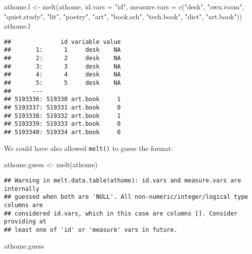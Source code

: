 \documentclass[
]{book}
\newenvironment{Shaded}{\begin{snugshade}}{\end{snugshade}}
\newcommand{\AttributeTok}[1]{\textcolor[rgb]{0.77,0.63,0.00}{#1}}
\newcommand{\FunctionTok}[1]{\textcolor[rgb]{0.00,0.00,0.00}{#1}}
\newcommand{\NormalTok}[1]{#1}
\newcommand{\OtherTok}[1]{\textcolor[rgb]{0.56,0.35,0.01}{#1}}
\newcommand{\StringTok}[1]{\textcolor[rgb]{0.31,0.60,0.02}{#1}}
\begin{document}
\begin{Shaded}
\begin{Highlighting}[]
\NormalTok{athome.l }\OtherTok{\textless{}{-}} \FunctionTok{melt}\NormalTok{(athome, }
                 \AttributeTok{id.vars =} \StringTok{"id"}\NormalTok{,}
                 \AttributeTok{measure.vars =} \FunctionTok{c}\NormalTok{(}\StringTok{"desk"}\NormalTok{, }\StringTok{"own.room"}\NormalTok{, }\StringTok{"quiet.study"}\NormalTok{, }\StringTok{"lit"}\NormalTok{,}
                                  \StringTok{"poetry"}\NormalTok{, }\StringTok{"art"}\NormalTok{, }\StringTok{"book.sch"}\NormalTok{, }\StringTok{"tech.book"}\NormalTok{,}
                                  \StringTok{"dict"}\NormalTok{, }\StringTok{"art.book"}\NormalTok{))}
\NormalTok{athome.l}
\end{Highlighting}
\end{Shaded}

\begin{verbatim}
##              id variable value
##       1:      1     desk    NA
##       2:      2     desk    NA
##       3:      3     desk    NA
##       4:      4     desk    NA
##       5:      5     desk    NA
##      ---                      
## 5193336: 519330 art.book     1
## 5193337: 519331 art.book     0
## 5193338: 519332 art.book     1
## 5193339: 519333 art.book     0
## 5193340: 519334 art.book     0
\end{verbatim}

We could have also allowed \texttt{melt()} to guess the format:

\begin{Shaded}
\begin{Highlighting}[]
\NormalTok{athome.guess }\OtherTok{\textless{}{-}} \FunctionTok{melt}\NormalTok{(athome)}
\end{Highlighting}
\end{Shaded}

\begin{verbatim}
## Warning in melt.data.table(athome): id.vars and measure.vars are internally
## guessed when both are 'NULL'. All non-numeric/integer/logical type columns are
## considered id.vars, which in this case are columns []. Consider providing at
## least one of 'id' or 'measure' vars in future.
\end{verbatim}

\begin{Shaded}
\begin{Highlighting}[]
\NormalTok{athome.guess}
\end{Highlighting}
\end{Shaded}
\end{document}
